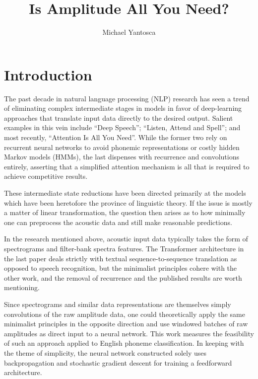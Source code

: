 \documentclass[10pt,epsf]{article}
\date{}
\title{Is Amplitude All You Need?}
\author{Michael Yantosca}
\begin{document}
\maketitle
\tableofcontents
\abstract{}{
}
\section{Introduction}{
  The past decade in natural language processing (NLP) research has seen a trend of
  eliminating complex intermediate stages in models in favor of deep-learning approaches
  that translate input data directly to the desired output. Salient examples in this vein include
  ``Deep Speech''\autocite{deepspeech}; ``Listen, Attend and Spell''\autocite{LAS};
  and most recently, ``Attention Is All You Need''\autocite{AIAYN}. While the former two
  rely on recurrent neural networks to avoid phonemic representations or costly
  hidden Markov models (HMMs), the last dispenses with recurrence and convolutions
  entirely, asserting that a simplified attention mechanism is all that is required
  to achieve competitive results.

  These intermediate state reductions have been directed primarily at the models
  which have been heretofore the province of linguistic theory. If the issue is
  mostly a matter of linear transformation, the question then arises as to how
  minimally one can preprocess the acoustic data and still make reasonable predictions.

  In the research mentioned above, acoustic input data typically takes the form of
  spectrograms\autocite[2]{deepspeech} and filter-bank spectra features\autocite[2]{LAS}.
  The Transformer architecture in the last paper deals strictly with textual sequence-to-sequence
  translation as opposed to speech recognition, but the minimalist principles cohere with
  the other work, and the removal of recurrence and the published results are worth mentioning.

  Since spectrograms and similar data representations are themselves simply convolutions
  of the raw amplitude data, one could theoretically apply the same minimalist principles in
  the opposite direction and use windowed batches of raw amplitudes as direct input to
  a neural network. This work measures the feasibility of such an approach applied to
  English phoneme classification. In keeping with the theme of simplicity, the neural
  network constructed solely uses backpropagation and stochastic gradient descent for training
  a feedforward architecture.
}
\end{document}
